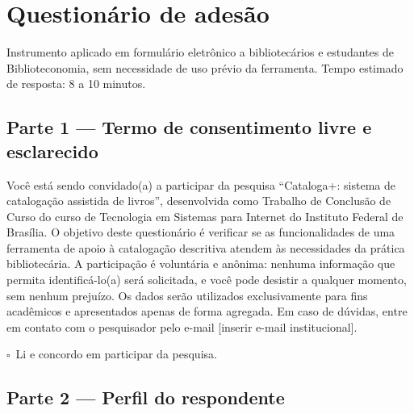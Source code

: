 
\providecommand{\caixa}{$\square$}
\providecommand{\opcao}[1]{\caixa~#1\quad}

\chapter{Questionário de adesão}
\label{ape:questionario-adesao}

Instrumento aplicado em formulário eletrônico a bibliotecários e estudantes de Biblioteconomia, sem necessidade de uso prévio da ferramenta. Tempo estimado de resposta: 8 a 10 minutos.

\section*{Parte 1 --- Termo de consentimento livre e esclarecido}

Você está sendo convidado(a) a participar da pesquisa ``Cataloga+: sistema de catalogação assistida de livros'', desenvolvida como Trabalho de Conclusão de Curso do curso de Tecnologia em Sistemas para Internet do Instituto Federal de Brasília. O objetivo deste questionário é verificar se as funcionalidades de uma ferramenta de apoio à catalogação descritiva atendem às necessidades da prática bibliotecária. A participação é voluntária e anônima: nenhuma informação que permita identificá-lo(a) será solicitada, e você pode desistir a qualquer momento, sem nenhum prejuízo. Os dados serão utilizados exclusivamente para fins acadêmicos e apresentados apenas de forma agregada. Em caso de dúvidas, entre em contato com o pesquisador pelo e-mail [inserir e-mail institucional].

\opcao{Li e concordo em participar da pesquisa.}

\section*{Parte 2 --- Perfil do respondente}

